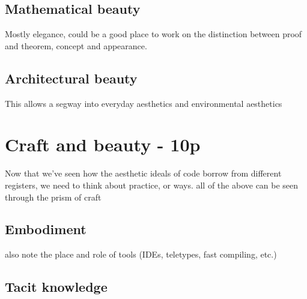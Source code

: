 \subsection{Mathematical beauty}

Mostly elegance, could be a good place to work on the distinction between proof and theorem, concept and appearance.

\subsection{Architectural beauty}

This allows a segway into everyday aesthetics and environmental aesthetics

\section{Craft and beauty - 10p}

Now that we've seen how the aesthetic ideals of code borrow from different registers, we need to think about practice, or ways. all of the above can be seen through the prism of craft

\subsection{Embodiment}

also note the place and role of tools (IDEs, teletypes, fast compiling, etc.)

\subsection{Tacit knowledge}

